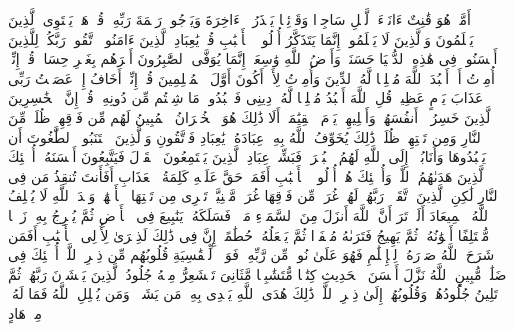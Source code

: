 \stopbuffer%
\startbuffer[\q:39:9]
أَمَّنۡ هُوَ قَٰنِتٌ ءَانَاۤءَ ٱلَّیۡلِ سَاجِدࣰا وَقَاۤئِمࣰا یَحۡذَرُ ٱلۡءَاخِرَةَ وَیَرۡجُوا۟ رَحۡمَةَ رَبِّهِۦۗ قُلۡ هَلۡ یَسۡتَوِی ٱلَّذِینَ یَعۡلَمُونَ وَٱلَّذِینَ لَا یَعۡلَمُونَۗ إِنَّمَا یَتَذَكَّرُ أُو۟لُوا۟ ٱلۡأَلۡبَٰبِ%
\stopbuffer%
\startbuffer[\q:39:10]
قُلۡ یَٰعِبَادِ ٱلَّذِینَ ءَامَنُوا۟ ٱتَّقُوا۟ رَبَّكُمۡۚ لِلَّذِینَ أَحۡسَنُوا۟ فِی هَٰذِهِ ٱلدُّنۡیَا حَسَنَةࣱۗ وَأَرۡضُ ٱللَّهِ وَٰسِعَةٌۗ إِنَّمَا یُوَفَّى ٱلصَّٰبِرُونَ أَجۡرَهُم بِغَیۡرِ حِسَابࣲ%
\stopbuffer%
\startbuffer[\q:39:11]
قُلۡ إِنِّیۤ أُمِرۡتُ أَنۡ أَعۡبُدَ ٱللَّهَ مُخۡلِصࣰا لَّهُ ٱلدِّینَ%
\stopbuffer%
\startbuffer[\q:39:12]
وَأُمِرۡتُ لِأَنۡ أَكُونَ أَوَّلَ ٱلۡمُسۡلِمِینَ%
\stopbuffer%
\startbuffer[\q:39:13]
قُلۡ إِنِّیۤ أَخَافُ إِنۡ عَصَیۡتُ رَبِّی عَذَابَ یَوۡمٍ عَظِیمࣲ%
\stopbuffer%
\startbuffer[\q:39:14]
قُلِ ٱللَّهَ أَعۡبُدُ مُخۡلِصࣰا لَّهُۥ دِینِی%
\stopbuffer%
\startbuffer[\q:39:15]
فَٱعۡبُدُوا۟ مَا شِئۡتُم مِّن دُونِهِۦۗ قُلۡ إِنَّ ٱلۡخَٰسِرِینَ ٱلَّذِینَ خَسِرُوۤا۟ أَنفُسَهُمۡ وَأَهۡلِیهِمۡ یَوۡمَ ٱلۡقِیَٰمَةِۗ أَلَا ذَٰلِكَ هُوَ ٱلۡخُسۡرَانُ ٱلۡمُبِینُ%
\stopbuffer%
\startbuffer[\q:39:16]
لَهُم مِّن فَوۡقِهِمۡ ظُلَلࣱ مِّنَ ٱلنَّارِ وَمِن تَحۡتِهِمۡ ظُلَلࣱۚ ذَٰلِكَ یُخَوِّفُ ٱللَّهُ بِهِۦ عِبَادَهُۥۚ یَٰعِبَادِ فَٱتَّقُونِ%
\stopbuffer%
\startbuffer[\q:39:17]
وَٱلَّذِینَ ٱجۡتَنَبُوا۟ ٱلطَّٰغُوتَ أَن یَعۡبُدُوهَا وَأَنَابُوۤا۟ إِلَى ٱللَّهِ لَهُمُ ٱلۡبُشۡرَىٰۚ فَبَشِّرۡ عِبَادِ%
\stopbuffer%
\startbuffer[\q:39:18]
ٱلَّذِینَ یَسۡتَمِعُونَ ٱلۡقَوۡلَ فَیَتَّبِعُونَ أَحۡسَنَهُۥۤۚ أُو۟لَٰۤئِكَ ٱلَّذِینَ هَدَىٰهُمُ ٱللَّهُۖ وَأُو۟لَٰۤئِكَ هُمۡ أُو۟لُوا۟ ٱلۡأَلۡبَٰبِ%
\stopbuffer%
\startbuffer[\q:39:19]
أَفَمَنۡ حَقَّ عَلَیۡهِ كَلِمَةُ ٱلۡعَذَابِ أَفَأَنتَ تُنقِذُ مَن فِی ٱلنَّارِ%
\stopbuffer%
\startbuffer[\q:39:20]
لَٰكِنِ ٱلَّذِینَ ٱتَّقَوۡا۟ رَبَّهُمۡ لَهُمۡ غُرَفࣱ مِّن فَوۡقِهَا غُرَفࣱ مَّبۡنِیَّةࣱ تَجۡرِی مِن تَحۡتِهَا ٱلۡأَنۡهَٰرُۖ وَعۡدَ ٱللَّهِ لَا یُخۡلِفُ ٱللَّهُ ٱلۡمِیعَادَ%
\stopbuffer%
\startbuffer[\q:39:21]
أَلَمۡ تَرَ أَنَّ ٱللَّهَ أَنزَلَ مِنَ ٱلسَّمَاۤءِ مَاۤءࣰ فَسَلَكَهُۥ یَنَٰبِیعَ فِی ٱلۡأَرۡضِ ثُمَّ یُخۡرِجُ بِهِۦ زَرۡعࣰا مُّخۡتَلِفًا أَلۡوَٰنُهُۥ ثُمَّ یَهِیجُ فَتَرَىٰهُ مُصۡفَرࣰّا ثُمَّ یَجۡعَلُهُۥ حُطَٰمًاۚ إِنَّ فِی ذَٰلِكَ لَذِكۡرَىٰ لِأُو۟لِی ٱلۡأَلۡبَٰبِ%
\stopbuffer%
\startbuffer[\q:39:22]
أَفَمَن شَرَحَ ٱللَّهُ صَدۡرَهُۥ لِلۡإِسۡلَٰمِ فَهُوَ عَلَىٰ نُورࣲ مِّن رَّبِّهِۦۚ فَوَیۡلࣱ لِّلۡقَٰسِیَةِ قُلُوبُهُم مِّن ذِكۡرِ ٱللَّهِۚ أُو۟لَٰۤئِكَ فِی ضَلَٰلࣲ مُّبِینٍ%
\stopbuffer%
\startbuffer[\q:39:23]
ٱللَّهُ نَزَّلَ أَحۡسَنَ ٱلۡحَدِیثِ كِتَٰبࣰا مُّتَشَٰبِهࣰا مَّثَانِیَ تَقۡشَعِرُّ مِنۡهُ جُلُودُ ٱلَّذِینَ یَخۡشَوۡنَ رَبَّهُمۡ ثُمَّ تَلِینُ جُلُودُهُمۡ وَقُلُوبُهُمۡ إِلَىٰ ذِكۡرِ ٱللَّهِۚ ذَٰلِكَ هُدَى ٱللَّهِ یَهۡدِی بِهِۦ مَن یَشَاۤءُۚ وَمَن یُضۡلِلِ ٱللَّهُ فَمَا لَهُۥ مِنۡ هَادٍ%
